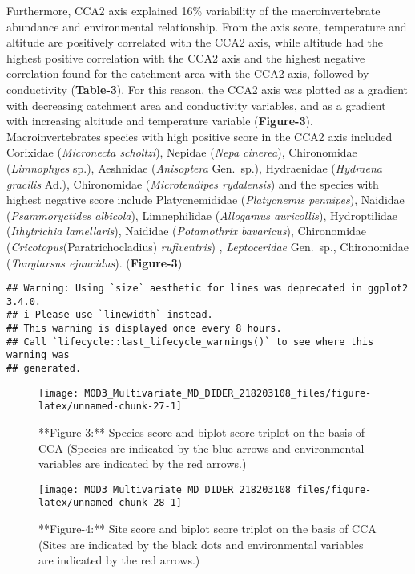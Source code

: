 \documentclass[
]{article}
\begin{document}
Furthermore, CCA2 axis explained 16\% variability of the
macroinvertebrate abundance and environmental relationship. From the
axis score, temperature and altitude are positively correlated with the
CCA2 axis, while altitude had the highest positive correlation with the
CCA2 axis and the highest negative correlation found for the catchment
area with the CCA2 axis, followed by conductivity (\textbf{Table-3}).
For this reason, the CCA2 axis was plotted as a gradient with decreasing
catchment area and conductivity variables, and as a gradient with
increasing altitude and temperature variable (\textbf{Figure-3}).
Macroinvertebrates species with high positive score in the CCA2 axis
included Corixidae (\emph{Micronecta scholtzi}), Nepidae (\emph{Nepa
cinerea}), Chironomidae (\emph{Limnophyes} sp.), Aeshnidae
(\emph{Anisoptera} Gen.~sp.), Hydraenidae (\emph{Hydraena gracilis}
Ad.), Chironomidae (\emph{Microtendipes rydalensis}) and the species
with highest negative score include Platycnemididae (\emph{Platycnemis
pennipes}), Naididae (\emph{Psammoryctides albicola}), Limnephilidae
(\emph{Allogamus auricollis}), Hydroptilidae (\emph{Ithytrichia
lamellaris}), Naididae (\emph{Potamothrix bavaricus}), Chironomidae
(\emph{Cricotopus}(Paratrichocladius) \emph{rufiventris}) ,
\emph{Leptoceridae} Gen.~sp., Chironomidae (\emph{Tanytarsus
ejuncidus}). (\textbf{Figure-3})

\begin{verbatim}
## Warning: Using `size` aesthetic for lines was deprecated in ggplot2 3.4.0.
## i Please use `linewidth` instead.
## This warning is displayed once every 8 hours.
## Call `lifecycle::last_lifecycle_warnings()` to see where this warning was
## generated.
\end{verbatim}

\begin{figure}

{\centering \texttt{[image: MOD3\_Multivariate\_MD\_DIDER\_218203108\_files/figure-latex/unnamed-chunk-27-1]} 

}

\caption{**Figure-3:** Species score and biplot score triplot on the basis of CCA (Species are indicated by the blue arrows and environmental variables are indicated by the red arrows.)}\label{fig:unnamed-chunk-27}
\end{figure}

\begin{figure}

{\centering \texttt{[image: MOD3\_Multivariate\_MD\_DIDER\_218203108\_files/figure-latex/unnamed-chunk-28-1]} 

}

\caption{**Figure-4:** Site score and biplot score triplot on the basis of CCA (Sites are indicated by the black dots and environmental variables are indicated by the red arrows.)}\label{fig:unnamed-chunk-28}
\end{figure}
\end{document}
